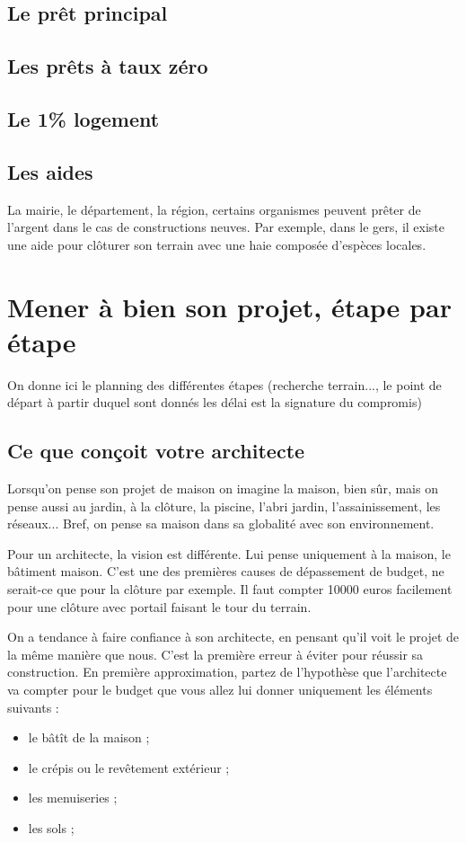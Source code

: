 \documentclass[french]{book}
\begin{document}
\section{Le prêt principal}
\section{Les prêts à taux zéro}
\section{Le 1\% logement}
\section{Les aides}
La mairie, le département, la région, certains organismes peuvent prêter de l'argent dans le cas de constructions neuves. Par exemple, dans le gers, il existe une aide pour clôturer son terrain avec une haie composée d'espèces locales.


\chapter{Mener à bien son projet, étape par étape}
On donne ici le planning des différentes étapes (recherche terrain..., le point de départ à partir duquel sont donnés les délai est la signature du compromis)



\section{Ce que conçoit votre architecte}
Lorsqu'on pense son projet de maison on imagine la maison, bien sûr, mais on pense aussi au jardin, à la clôture, la piscine, l'abri jardin, l'assainissement, les réseaux... Bref, on pense sa maison dans sa globalité avec son environnement. 

Pour un architecte, la vision est différente. Lui pense uniquement à la maison, le bâtiment maison. C'est une des premières causes de dépassement de budget, ne serait-ce que pour la clôture par exemple. Il faut compter 10000 euros facilement pour une clôture avec portail faisant le tour du terrain.

On a tendance à faire confiance à son architecte, en pensant qu'il voit le projet de la même manière que nous. C'est la première erreur à éviter pour réussir sa construction. En première approximation, partez de l'hypothèse que l'architecte va compter pour le budget que vous allez lui donner uniquement les éléments suivants :
\begin{itemize}
    \item le bâtît de la maison ;
    \item le crépis ou le revêtement extérieur ;
    \item les menuiseries ;
    \item les sols ;
\end{itemize}
\end{document}
